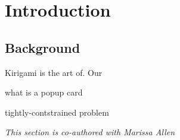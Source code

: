 \chapter{Introduction}

\section{Background}\label{background}

Kirigami is the art of. Our

what is a popup card

tightly-contstrained problem

\emph{This section is co-authored with Marissa Allen}
